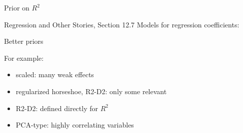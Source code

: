 \documentclass[english,t]{beamer}
\begin{document}
\begin{frame}{Prior on $R^2$}

  Regression and Other Stories, Section 12.7 Models for regression
  coefficients: 


  
\end{frame}

\begin{frame}{Better priors}

  For example:
  \begin{itemize}
  \item scaled: many weak effects
  \item regularized horseshoe, R2-D2: only some relevant
  \item R2-D2: defined directly for $R^2$
  \item PCA-type: highly correlating variables
  \end{itemize}

\end{frame}
\end{document}

